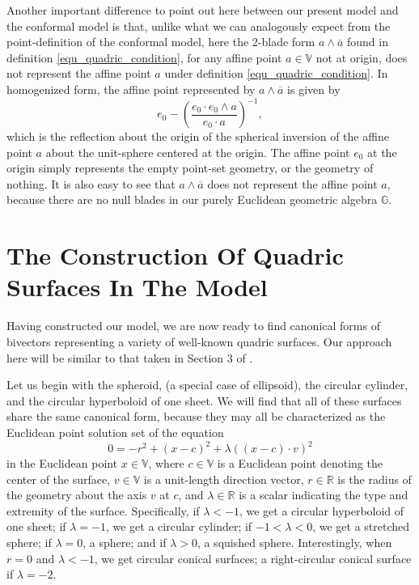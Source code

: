 \documentclass{birkjour}
\theoremstyle{definition}
\theoremstyle{remark}
\numberwithin{equation}{section}
\newcommand{\G}{\mathbb{G}}
\newcommand{\V}{\mathbb{V}}
\newcommand{\R}{\mathbb{R}}
\begin{document}
Another important difference to point out here between our present model and the conformal model is that,
unlike what we can analogously expect from the point-definition of the conformal model,
here the 2-blade form $a\wedge\overline{a}$ found in definition \eqref{equ_quadric_condition}, for
any affine point $a\in\V$ not at origin, does not represent the affine point $a$ under definition \eqref{equ_quadric_condition}.
In homogenized form, the affine point represented by $a\wedge\overline{a}$ is given by
\begin{equation}
e_0 - \left(\frac{e_0\cdot e_0\wedge a}{e_0\cdot a}\right)^{-1},
\end{equation}
which is the reflection about the origin of the spherical inversion of the affine point $a$
about the unit-sphere centered at the origin.  The affine point $e_0$ at the origin
simply represents the empty point-set geometry, or the geometry of nothing.  It is also
easy to see that $a\wedge\overline{a}$ does not represent the affine point $a$, because there are no
null blades in our purely Euclidean geometric algebra $\G$.

\section{The Construction Of Quadric Surfaces In The Model}

Having constructed our model, we are now ready to find canonical forms of bivectors
representing a variety of well-known quadric surfaces.  Our approach here will be
similar to that taken in Section 3 of \cite{Miller87}.

Let us begin with the
spheroid, (a special case of ellipsoid), the circular cylinder, and the circular hyperboloid
of one sheet.  We will find that all of these surfaces share the same canonical form,
because they may all be characterized as the Euclidean point solution set of the equation
\begin{equation}\label{equ_spheroid}
0 = -r^2 + (x-c)^2 + \lambda((x-c)\cdot v)^2
\end{equation}
in the Euclidean point $x\in\V$, where $c\in\V$ is a Euclidean
point denoting the center of the surface, $v\in\V$ is a unit-length direction
vector, $r\in\R$ is the radius of the geometry about the axis $v$ at $c$, and
$\lambda\in\R$ is a scalar indicating the type and extremity of the surface.
Specifically, if $\lambda<-1$, we get a circular hyperboloid of one sheet;
if $\lambda=-1$, we get a circular cylinder; if $-1<\lambda<0$, we get a stretched
sphere; if $\lambda=0$, a sphere; and if $\lambda>0$, a squished sphere.  Interestingly,
when $r=0$ and $\lambda<-1$, we get circular conical surfaces; a right-circular conical
surface if $\lambda=-2$.
\end{document}
